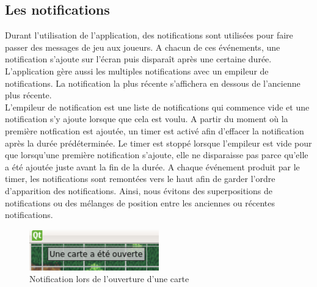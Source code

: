 \subsection{Les notifications}

Durant l'utilisation de l'application, des notifications sont utilisées pour faire passer des messages de jeu aux joueurs. A chacun de ces événements, une notification s'ajoute sur l'écran puis disparaît après une certaine durée. L'application gère aussi les multiples notifications avec un empileur de notifications. La notification la plus récente s'affichera en dessous de l'ancienne plus récente. \\

L'empileur de notification est une liste de notifications qui commence vide et une notification s'y ajoute lorsque que cela est voulu. A partir du moment où la première notfication est ajoutée, un timer est activé afin d'effacer la notification après la durée prédéterminée. Le timer est stoppé lorsque l'empileur est vide pour que lorsqu'une première notification s'ajoute, elle ne disparaisse pas parce qu'elle a été ajoutée juste avant la fin de la durée. A chaque événement produit par le timer, les notifications sont remontées vers le haut afin de garder l'ordre d'apparition des notifications. Ainsi, nous évitons des superpositions de notifications ou des mélanges de position entre les anciennes ou récentes notifications.

\begin{figure}[h!]
	\centering
	\includegraphics[width=0.5\textwidth]{img/notification.png}
	\caption{Notification lors de l'ouverture d'une carte}
	\label{fig:notification}
\end{figure}